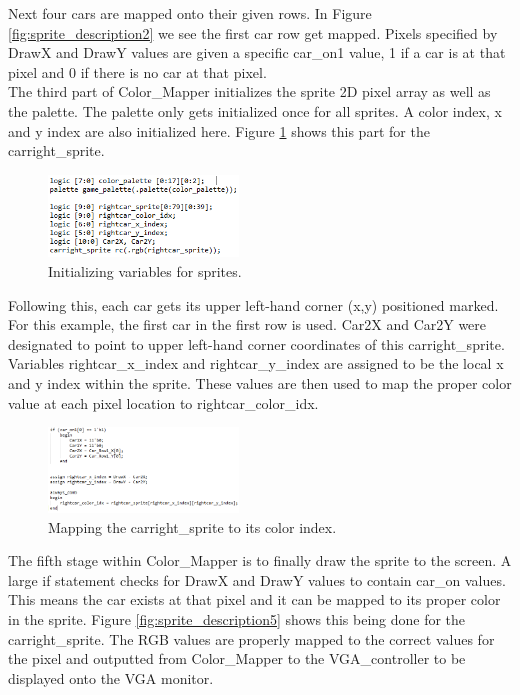 \documentclass[journal, twocolumn, final,11pt,letterpaper]{IEEEtran}
\begin{document}
Next four cars are mapped onto their given rows.  In Figure \ref{fig:sprite_description2} we see the first car row get mapped.  Pixels specified by DrawX and DrawY values are given a specific car\_on1 value, 1 if a car is at that pixel and 0 if there is no car at that pixel.  \\

The third part of Color\_Mapper initializes the sprite 2D pixel array as well as the palette.  The palette only gets initialized once for all sprites.  A color index, x and y index are also initialized here.  Figure \ref{fig:sprite_description3} shows this part for the carright\_sprite.            

 	\begin{figure}[H]
 		\centering
 		\includegraphics[width=0.45\textwidth]{sprite_description3.png}
 		\caption{Initializing variables for sprites.}
 		\label{fig:sprite_description3}
 	\end{figure} 

Following this, each car gets its upper left-hand corner (x,y) positioned marked.  For this example, the first car in the first row is used.  Car2X and Car2Y were designated to point to upper left-hand corner coordinates of this carright\_sprite. Variables rightcar\_x\_index and rightcar\_y\_index are assigned to be the local x and y index within the sprite.  These values are then used to map the proper color value at each pixel location to rightcar\_color\_idx.   
	
 	\begin{figure}[H]
 		\centering
 		\includegraphics[width=0.45\textwidth]{sprite_description4.png}
 		\caption{Mapping the carright\_sprite to its color index.}
 		\label{fig:sprite_description4}
 	\end{figure}	

	
The fifth stage within Color\_Mapper is to finally draw the sprite to the screen.  A large if statement checks for DrawX and DrawY values to contain car\_on values.  This means the car exists at that pixel and it can be mapped to its proper color in the sprite.  Figure \ref{fig:sprite_description5} shows this being done for the carright\_sprite.  The RGB values are properly mapped to the correct values for the pixel and outputted from Color\_Mapper to the VGA\_controller to be displayed onto the VGA monitor. 
\end{document}
